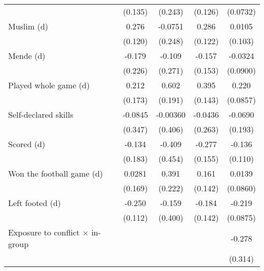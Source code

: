 {\begin{tabular}{l*{4}{c}}
                    &     (0.135)         &     (0.243)         &     (0.126)         &    (0.0732)         \\
[1em]
Muslim (d)          &       0.276\sym{**} &     -0.0751         &       0.286\sym{**} &      0.0105         \\
                    &     (0.120)         &     (0.248)         &     (0.122)         &     (0.103)         \\
[1em]
Mende (d)           &      -0.179         &      -0.109         &      -0.157         &     -0.0324         \\
                    &     (0.226)         &     (0.271)         &     (0.153)         &    (0.0900)         \\
[1em]
Played whole game (d)&       0.212         &       0.602\sym{***}&       0.395\sym{***}&       0.220\sym{**} \\
                    &     (0.173)         &     (0.191)         &     (0.143)         &    (0.0857)         \\
[1em]
Self-declared skills&     -0.0845         &    -0.00360         &     -0.0436         &     -0.0690         \\
                    &     (0.347)         &     (0.406)         &     (0.263)         &     (0.193)         \\
[1em]
Scored (d)          &      -0.134         &      -0.409         &      -0.277\sym{*}  &      -0.136         \\
                    &     (0.183)         &     (0.454)         &     (0.155)         &     (0.110)         \\
[1em]
Won the football game (d)&      0.0281         &       0.391\sym{*}  &       0.161         &      0.0139         \\
                    &     (0.169)         &     (0.222)         &     (0.142)         &    (0.0860)         \\
[1em]
Left footed (d)     &      -0.250\sym{**} &      -0.159         &      -0.184         &      -0.219\sym{**} \\
                    &     (0.112)         &     (0.400)         &     (0.142)         &    (0.0875)         \\
[1em]
Exposure to conflict × in-group&                     &                     &                     &      -0.278         \\
                    &                     &                     &                     &     (0.314)         \\

\end{tabular}}
